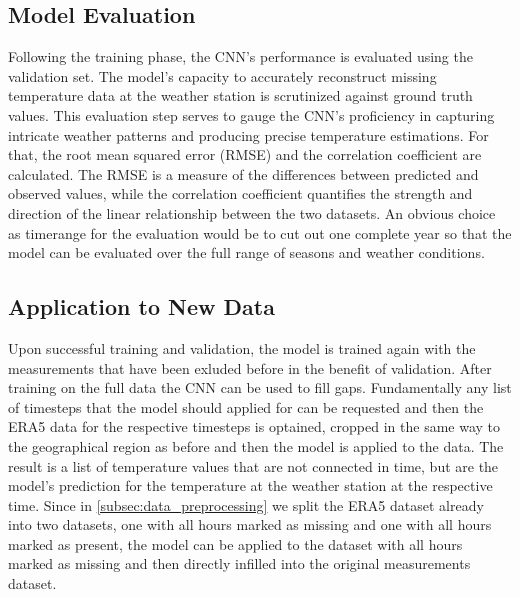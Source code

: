 \subsection{Model Evaluation}
Following the training phase, the CNN's performance is evaluated using the validation set. The model's capacity to accurately reconstruct missing temperature data at the weather station is scrutinized against ground truth values. This evaluation step serves to gauge the CNN's proficiency in capturing intricate weather patterns and producing precise temperature estimations. For that, the root mean squared error (RMSE) and the correlation coefficient are calculated. The RMSE is a measure of the differences between predicted and observed values, while the correlation coefficient quantifies the strength and direction of the linear relationship between the two datasets. An obvious choice as timerange for the evaluation would be to cut out one complete year so that the model can be evaluated over the full range of seasons and weather conditions. 

\subsection{Application to New Data}
Upon successful training and validation, the model is trained again with the measurements that have been exluded before in the benefit of validation. After training on the full data the CNN can be used to fill gaps. Fundamentally any list of timesteps that the model should applied for can be requested and then the ERA5 data for the respective timesteps is optained, cropped in the same way to the geographical region as before and then the model is applied to the data. The result is a list of temperature values that are not connected in time, but are the model's prediction for the temperature at the weather station at the respective time. Since in \ref{subsec:data_preprocessing} we split the ERA5 dataset already into two datasets, one with all hours marked as missing and one with all hours marked as present, the model can be applied to the dataset with all hours marked as missing and then directly infilled into the original measurements dataset.